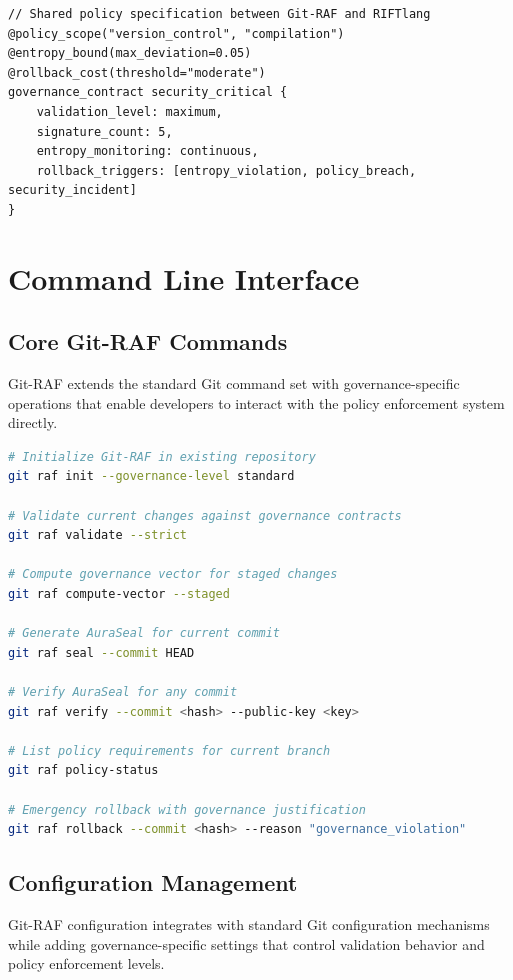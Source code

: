 \begin{lstlisting}[style=riftlang, language=rift]
// Shared policy specification between Git-RAF and RIFTlang
@policy_scope("version_control", "compilation")
@entropy_bound(max_deviation=0.05)
@rollback_cost(threshold="moderate")
governance_contract security_critical {
    validation_level: maximum,
    signature_count: 5,
    entropy_monitoring: continuous,
    rollback_triggers: [entropy_violation, policy_breach, security_incident]
}
\end{lstlisting}

\section{Command Line Interface}

\subsection{Core Git-RAF Commands}

Git-RAF extends the standard Git command set with governance-specific operations that enable developers to interact with the policy enforcement system directly.

\begin{lstlisting}[style=riftlang, language=bash]
# Initialize Git-RAF in existing repository
git raf init --governance-level standard

# Validate current changes against governance contracts
git raf validate --strict

# Compute governance vector for staged changes  
git raf compute-vector --staged

# Generate AuraSeal for current commit
git raf seal --commit HEAD

# Verify AuraSeal for any commit
git raf verify --commit <hash> --public-key <key>

# List policy requirements for current branch
git raf policy-status

# Emergency rollback with governance justification
git raf rollback --commit <hash> --reason "governance_violation"
\end{lstlisting}

\subsection{Configuration Management}

Git-RAF configuration integrates with standard Git configuration mechanisms while adding governance-specific settings that control validation behavior and policy enforcement levels.


